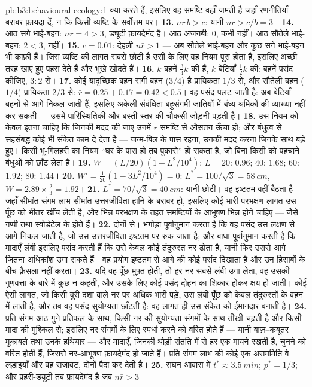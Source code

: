 \begin{solution}{pb:b3:behavioural-ecology:1}
क्या करते हैं, इसलिए वह समष्टि वहाँ जमती है जहाँ रणनीतियाँ बराबर
फ़ायदा दें, न कि किसी व्यष्टि के सर्वोत्तम पर।
\textbf{13.} $n\bar r\,b > c$: यानी $n\bar r > c/b = 3$।
\textbf{14.} आठ सगे भाई-बहन: $n\bar r = 4 > 3$, ड्यूटी फ़ायदेमंद है। आठ
अजनबी: $0$, कभी नहीं। आठ सौतेले भाई-बहन: $2 < 3$, नहीं।
\textbf{15.} $c = 0.01$: देहली $n\bar r > 1$ --- अब सौतेले भाई-बहन और
कुछ सगे भाई-बहन भी काफ़ी हैं। जिस व्यष्टि की लागत सबसे छोटी है उसी के
लिए वह नियम पूरा होता है, इसलिए अच्छी तरह खाए हुए पहरा देते हैं और भूखे
खोदते हैं।
\textbf{16.} $k$ बहनें $\tfrac{3}{4}k$ की हैं, $k$ बेटियाँ
$\tfrac{1}{2}k$ की: बहनें पसंद कीजिए, $3{:}2$ से।
\textbf{17.} कोई यादृच्छिक बहन सगी बहन ($3/4$) है प्रायिकता $1/3$ से,
और सौतेली बहन ($1/4$) प्रायिकता $2/3$ से: $\bar r = 0.25 +
0.17 = 0.42 < 0.5$। वह पसंद पलट जाती है: अब बेटियाँ बहनों से आगे निकल
जाती हैं, इसलिए अकेली संबंधिता बहुसंगमी जातियों में बंध्य श्रमिकों की
व्याख्या नहीं कर सकती --- उसमें पारिस्थितिकी और बस्ती-स्तर की चौकसी
जोड़नी पड़ती है।
\textbf{18.} उस नियम को केवल इतना चाहिए कि जिनकी मदद की जाए उनमें $r$
समष्टि से औसतन ऊँचा हो; और बंधुत्व से सहसंबद्ध कोई भी संकेत काम दे देता
है --- जन्म-बिल के पास रहना, उनकी मदद करना जिनके साथ बड़े हुए। किसी
भू-गिलहरी का नियम ``घर के पास हो तब पुकारो'' हो सकता है, जो बिना किसी को
पहचाने बंधुओं को छाँट लेता है।
\textbf{19.} $W = (L/20)(1 - L^{2}/10^{4})$: $L = 20$: $0.96$; $40$:
$1.68$; $60$: $1.92$; $80$: $1.44$।
\textbf{20.} $W' = \tfrac{1}{20}(1 - 3L^{2}/10^{4}) = 0$: $L^{*} = 100/\sqrt{3}
= \qty{58}{cm}$, $W = 2.89\times\tfrac{2}{3} = 1.92$।
\textbf{21.} $L^{*} = 70/\sqrt{3} = \qty{40}{cm}$: यानी छोटी। वह इष्टतम
वहीं बैठता है जहाँ सीमांत संगम-लाभ सीमांत उत्तरजीविता-हानि के बराबर हो,
इसलिए कोई भारी परभक्षण-लागत उस पूँछ को भीतर खींच लेती है, और भिन्न
परभक्षण के तहत समष्टियों के आभूषण भिन्न होने चाहिए --- जैसे गप्पी तथा
स्वोर्डटेल के होते हैं।
\textbf{22.} दोनों से। भगोड़ा पूर्वानुमान करता है कि वह पसंद उस लक्षण से
आगे निकल जाती है, जो उस उत्तरजीविता-इष्टतम पर रुक जाता है; और बाधा
पूर्वानुमान करती है कि मादाएँ लंबी इसलिए पसंद करती हैं कि उसे केवल कोई
तंदुरुस्त नर ढोता है, यानी फिर उससे आगे जितना अधिकांश उगा सकते हैं। वह
प्रयोग इष्टतम से आगे की कोई पसंद दिखाता है और उन हिसाबों के बीच फ़ैसला
नहीं करता।
\textbf{23.} यदि वह पूँछ मुफ़्त होती, तो हर नर सबसे लंबी उगा लेता, वह
उसकी गुणवत्ता के बारे में कुछ न कहती, और उसके लिए कोई पसंद दोहन का
शिकार होकर क्षय हो जाती। कोई ऐसी लागत, जो किसी बुरी दशा वाले नर पर
अधिक भारी पड़े, उस लंबी पूँछ को केवल तंदुरुस्तों के वहन में लाती है, और
तब वह पसंद सुयोग्यता छाँटती है: वह लागत ही उस संकेत को ईमानदार बनाती है।
\textbf{24.} प्रति संगम आठ गुने प्रतिफल के साथ, किसी नर की सुयोग्यता संगमों
के साथ तीखी चढ़ती है और किसी मादा की मुश्किल से; इसलिए नर संगमों के लिए
स्पर्धा करने को वरित होते हैं --- यानी बाज़--कबूतर मुक़ाबले तथा उनके
हथियार --- और मादाएँ, जिनकी थोड़ी संतति में से हर एक मायने रखती है,
चुनने को वरित होती हैं, जिससे नर-आभूषण फ़ायदेमंद हो जाते हैं। प्रति
संगम लाभ की कोई एक असममिति वे लड़ाइयाँ और वह सजावट, दोनों पैदा कर देती
है।
\textbf{25.} सघन आवास में $t^{*} \approx \qty{3.5}{min}$; $p^{*}
= 1/3$; और प्रहरी-ड्यूटी तब फ़ायदेमंद है जब $n\bar r > 3$।
\end{solution}
